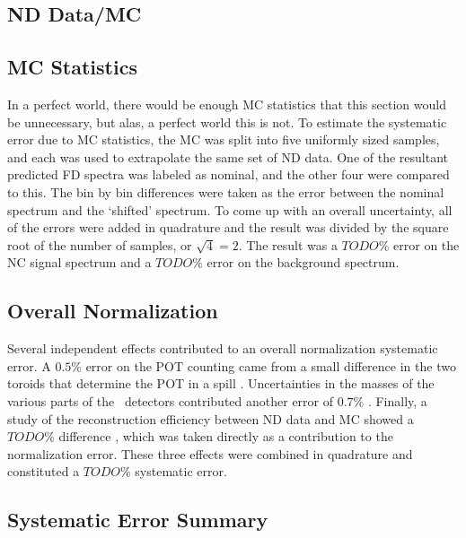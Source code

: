 \subsection{ND Data/MC}

\subsection{MC Statistics}

In a perfect world, there would be enough MC statistics that this section would be unnecessary, but alas, a perfect world this is not. To estimate the systematic error due to MC statistics, the MC was split into five uniformly sized samples, and each was used to extrapolate the same set of ND data. One of the resultant predicted FD spectra was labeled as nominal, and the other four were compared to this. The bin by bin differences were taken as the error between the nominal spectrum and the `shifted' spectrum. To come up with an overall uncertainty, all of the errors were added in quadrature and the result was divided by the square root of the number of samples, or $\sqrt{4} = 2$. The result was a $TODO\%$ error on the NC signal spectrum and a $TODO\%$ error on the background spectrum.

\subsection{Overall Normalization}

Several independent effects contributed to an overall normalization systematic error. A $0.5\%$ error on the POT counting came from a small difference in the two toroids that determine the POT in a spill \cite{ref:TNBeam}. Uncertainties in the masses of the various parts of the \nova~detectors contributed another error of $0.7\%$ \cite{ref:MassError}. Finally, a study of the reconstruction efficiency between ND data and MC showed a $TODO\%$ difference \cite{ref:NDDataMCRecoEff}, which was taken directly as a contribution to the normalization error. These three effects were combined in quadrature and constituted a $TODO\%$ systematic error.

\subsection{Systematic Error Summary}

